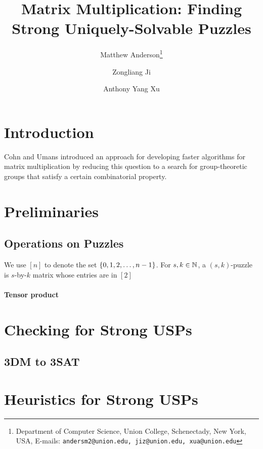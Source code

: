 \documentclass[11pt]{article}
\date{}
\title{Matrix Multiplication: Finding Strong Uniquely-Solvable Puzzles
{\IfFileExists{./sha.tex}{\\\small SHA: }{}}}
\author{
Matthew Anderson\thanks{Department of Computer Science, Union College, Schenectady, New York, USA, E-mails: \texttt{andersm2@union.edu, jiz@union.edu, xua@union.edu}}%
\and%
Zongliang Ji\samethanks[1]
\and%
Anthony Yang Xu\samethanks[1]
}
\begin{document}
\maketitle

\begin{abstract}

\end{abstract}

\thispagestyle{empty}
\newpage
{}


\section{Introduction}
\label{sec:intro}

Cohn and Umans \cite{cu03} introduced an approach for developing
faster algorithms for matrix multiplication by reducing this question
to a search for group-theoretic groups that satisfy a certain
combinatorial property.

\section{Preliminaries}
\label{sec:prelim}

\subsection{Operations on Puzzles}
\label{subsec:ops}

We use $[n]$ to denote the set $\left\{ 0,1,2,\ldots, n-1 \right\}$.  For $s, k
\in \mathbb{N}$, a $(s,k)$-puzzle is $s$-by-$k$ matrix whose entries are
in $[2]$

\paragraph{Tensor product}


\section{Checking for Strong USPs}
\label{sec:check}

\subsection{3DM to 3SAT}
\label{subsec:3sat}


\section{Heuristics for Strong USPs}
\label{sec:heuristic}
\end{document}
